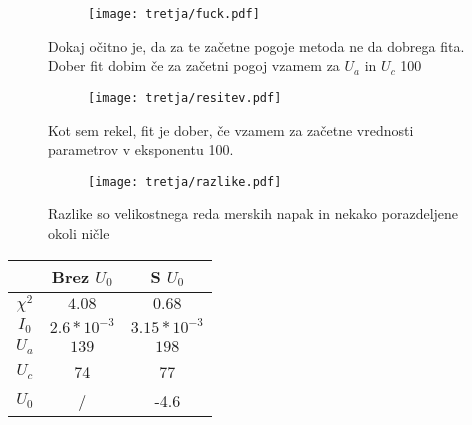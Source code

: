 \documentclass{article}
\begin{document}
\begin{figure}[H]
\centering
\begin{subfigure}{.8\textwidth}
\texttt{[image: tretja/fuck.pdf]}
\end{subfigure}
\caption*{Dokaj očitno je, da za te začetne pogoje metoda ne da dobrega fita. Dober fit dobim če za začetni pogoj vzamem za $U_a$ in $U_c$ 100}
\end{figure}

\begin{figure}[H]
\centering
\begin{subfigure}{.8\textwidth}
\texttt{[image: tretja/resitev.pdf]}
\end{subfigure}
\caption*{Kot sem rekel, fit je dober, če vzamem za začetne vrednosti parametrov v eksponentu 100.}
\end{figure}

\begin{figure}[H]
\centering
\begin{subfigure}{.8\textwidth}
\texttt{[image: tretja/razlike.pdf]}
\end{subfigure}
\caption*{Razlike so velikostnega reda merskih napak in nekako porazdeljene okoli ničle}
\end{figure}

\begin{center}
\begin{tabular}{|c|c|c|}
\hline
& Brez $U_0$ & S $U_0$\\ \hline
$\chi^2$ & $4.08$ & $0.68$ \\ \hline
$I_0$ & $2.6*10^{-3}$& $3.15*10^{-3}$\\ \hline
$U_a$ & $139$ &$198$\\ \hline
$U_c$ & 74 & 77 \\ \hline
$U_0$ & / & -4.6 \\ \hline
\end{tabular}
\end{center}
\end{document}
